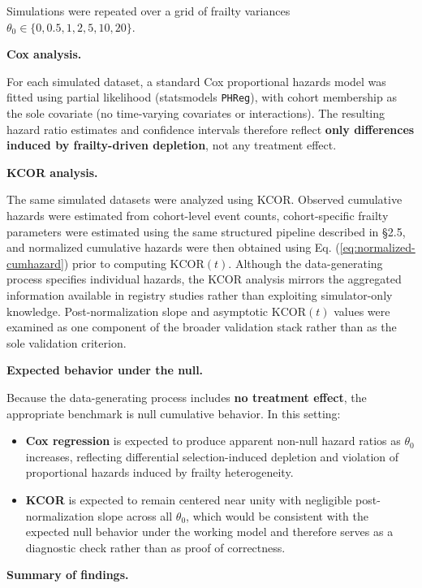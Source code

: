 \documentclass[
]{article}
\providecommand{\tightlist}{%
  \setlength{\itemsep}{0pt}\setlength{\parskip}{0pt}}
\begin{document}
Simulations were repeated over a grid of frailty variances
\(\theta_0 \in \{0, 0.5, 1, 2, 5, 10, 20\}\).

\textbf{Cox analysis.}

For each simulated dataset, a standard Cox proportional hazards model
was fitted using partial likelihood (statsmodels \texttt{PHReg}), with
cohort membership as the sole covariate (no time-varying covariates or
interactions). The resulting hazard ratio estimates and confidence
intervals therefore reflect \textbf{only differences induced by
frailty-driven depletion}, not any treatment effect.

\textbf{KCOR analysis.}

The same simulated datasets were analyzed using KCOR. Observed
cumulative hazards were estimated from cohort-level event counts,
cohort-specific frailty parameters were estimated using the same
structured pipeline described in §2.5, and normalized cumulative hazards
were then obtained using Eq. (\ref{eq:normalized-cumhazard}) prior to
computing \(\mathrm{KCOR}(t)\). Although the data-generating process
specifies individual hazards, the KCOR analysis mirrors the aggregated
information available in registry studies rather than exploiting
simulator-only knowledge. Post-normalization slope and asymptotic
\(\mathrm{KCOR}(t)\) values were examined as one component of the
broader validation stack rather than as the sole validation criterion.

\textbf{Expected behavior under the null.}

Because the data-generating process includes \textbf{no treatment
effect}, the appropriate benchmark is null cumulative behavior. In this
setting:

\begin{itemize}
\tightlist
\item
  \textbf{Cox regression} is expected to produce apparent non-null
  hazard ratios as \(\theta_0\) increases, reflecting differential
  selection-induced depletion and violation of proportional hazards
  induced by frailty heterogeneity.
\item
  \textbf{KCOR} is expected to remain centered near unity with
  negligible post-normalization slope across all \(\theta_0\), which
  would be consistent with the expected null behavior under the working
  model and therefore serves as a diagnostic check rather than as proof
  of correctness.
\end{itemize}

\textbf{Summary of findings.}
\end{document}

